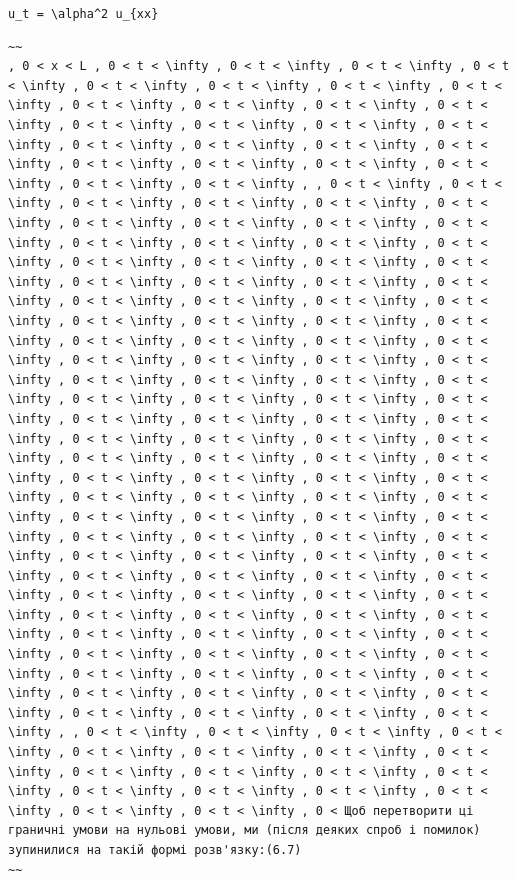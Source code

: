 \documentclass[
  ukrainian,
]{article}
\begin{document}
\texttt{u\_t\ =\ \textbackslash{}alpha\^{}2\ u\_\{xx\}}

\begin{verbatim}
~~
, 0 < x < L , 0 < t < \infty , 0 < t < \infty , 0 < t < \infty , 0 < t < \infty , 0 < t < \infty , 0 < t < \infty , 0 < t < \infty , 0 < t < \infty , 0 < t < \infty , 0 < t < \infty , 0 < t < \infty , 0 < t < \infty , 0 < t < \infty , 0 < t < \infty , 0 < t < \infty , 0 < t < \infty , 0 < t < \infty , 0 < t < \infty , 0 < t < \infty , 0 < t < \infty , 0 < t < \infty , 0 < t < \infty , 0 < t < \infty , 0 < t < \infty , 0 < t < \infty , 0 < t < \infty , , 0 < t < \infty , 0 < t < \infty , 0 < t < \infty , 0 < t < \infty , 0 < t < \infty , 0 < t < \infty , 0 < t < \infty , 0 < t < \infty , 0 < t < \infty , 0 < t < \infty , 0 < t < \infty , 0 < t < \infty , 0 < t < \infty , 0 < t < \infty , 0 < t < \infty , 0 < t < \infty , 0 < t < \infty , 0 < t < \infty , 0 < t < \infty , 0 < t < \infty , 0 < t < \infty , 0 < t < \infty , 0 < t < \infty , 0 < t < \infty , 0 < t < \infty , 0 < t < \infty , 0 < t < \infty , 0 < t < \infty , 0 < t < \infty , 0 < t < \infty , 0 < t < \infty , 0 < t < \infty , 0 < t < \infty , 0 < t < \infty , 0 < t < \infty , 0 < t < \infty , 0 < t < \infty , 0 < t < \infty , 0 < t < \infty , 0 < t < \infty , 0 < t < \infty , 0 < t < \infty , 0 < t < \infty , 0 < t < \infty , 0 < t < \infty , 0 < t < \infty , 0 < t < \infty , 0 < t < \infty , 0 < t < \infty , 0 < t < \infty , 0 < t < \infty , 0 < t < \infty , 0 < t < \infty , 0 < t < \infty , 0 < t < \infty , 0 < t < \infty , 0 < t < \infty , 0 < t < \infty , 0 < t < \infty , 0 < t < \infty , 0 < t < \infty , 0 < t < \infty , 0 < t < \infty , 0 < t < \infty , 0 < t < \infty , 0 < t < \infty , 0 < t < \infty , 0 < t < \infty , 0 < t < \infty , 0 < t < \infty , 0 < t < \infty , 0 < t < \infty , 0 < t < \infty , 0 < t < \infty , 0 < t < \infty , 0 < t < \infty , 0 < t < \infty , 0 < t < \infty , 0 < t < \infty , 0 < t < \infty , 0 < t < \infty , 0 < t < \infty , 0 < t < \infty , 0 < t < \infty , 0 < t < \infty , 0 < t < \infty , 0 < t < \infty , 0 < t < \infty , 0 < t < \infty , 0 < t < \infty , 0 < t < \infty , 0 < t < \infty , 0 < t < \infty , 0 < t < \infty , 0 < t < \infty , 0 < t < \infty , 0 < t < \infty , 0 < t < \infty , 0 < t < \infty , 0 < t < \infty , 0 < t < \infty , 0 < t < \infty , 0 < t < \infty , 0 < t < \infty , 0 < t < \infty , 0 < t < \infty , 0 < t < \infty , 0 < t < \infty , 0 < t < \infty , 0 < t < \infty , , 0 < t < \infty , 0 < t < \infty , 0 < t < \infty , 0 < t < \infty , 0 < t < \infty , 0 < t < \infty , 0 < t < \infty , 0 < t < \infty , 0 < t < \infty , 0 < t < \infty , 0 < t < \infty , 0 < t < \infty , 0 < t < \infty , 0 < t < \infty , 0 < t < \infty , 0 < t < \infty , 0 < t < \infty , 0 < t < \infty , 0 < Щоб перетворити ці граничні умови на нульові умови, ми (після деяких спроб і помилок) зупинилися на такій формі розв'язку:(6.7)
~~
\end{verbatim}
\end{document}
